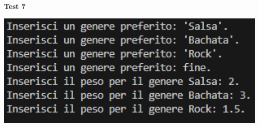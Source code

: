 \documentclass[a4paper,11pt]{article}
\begin{document}
\begin{center}
    \textbf{Test 7}
    \par
    \vspace{0.5cm}
    \includegraphics[width=1\textwidth]{ptest7}
\end{center}
\end{document}
